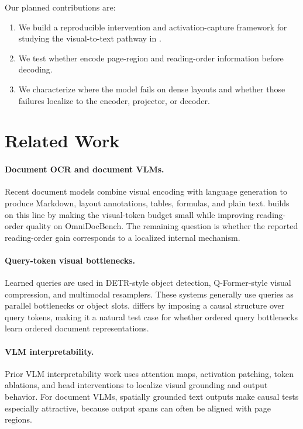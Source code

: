 \documentclass{article}
\begin{document}
Our planned contributions are:

\begin{enumerate}
  \item We build a reproducible intervention and activation-capture framework for studying the visual-to-text pathway in \modelname{}.
  \item We test whether \flowtokens{} encode page-region and reading-order information before decoding.
  \item We characterize where the model fails on dense layouts and whether those failures localize to the encoder, projector, or decoder.
\end{enumerate}

\section{Related Work}

\paragraph{Document OCR and document VLMs.}
Recent document models combine visual encoding with language generation to produce Markdown, layout annotations, tables, formulas, and plain text. \modelname{} builds on this line by making the visual-token budget small while improving reading-order quality on OmniDocBench. The remaining question is whether the reported reading-order gain corresponds to a localized internal mechanism.

\paragraph{Query-token visual bottlenecks.}
Learned queries are used in DETR-style object detection, Q-Former-style visual compression, and multimodal resamplers. These systems generally use queries as parallel bottlenecks or object slots. \modelname{} differs by imposing a causal structure over query tokens, making it a natural test case for whether ordered query bottlenecks learn ordered document representations.

\paragraph{VLM interpretability.}
Prior VLM interpretability work uses attention maps, activation patching, token ablations, and head interventions to localize visual grounding and output behavior. For document VLMs, spatially grounded text outputs make causal tests especially attractive, because output spans can often be aligned with page regions.
\end{document}
